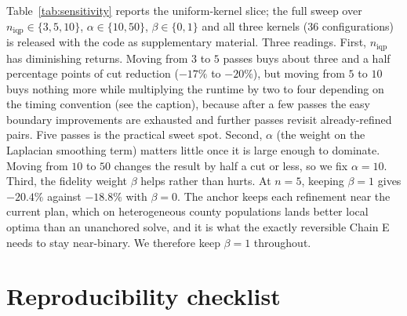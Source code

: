 \documentclass[11pt]{article}
\begin{document}
Table~\ref{tab:sensitivity} reports the uniform-kernel slice; the
full sweep over $n_{\mathrm{iqp}} \in \{3,5,10\}$,
$\alpha \in \{10,50\}$, $\beta \in \{0,1\}$ and all three kernels
(36 configurations) is released with the code as supplementary
material. Three readings. First, $n_{\mathrm{iqp}}$ has diminishing
returns.
Moving from $3$ to $5$ passes buys about three and a half percentage
points of cut reduction ($-17\%$ to $-20\%$), but moving from $5$ to
$10$ buys nothing more while multiplying the runtime by two to four
depending on the timing convention (see the caption), because after a
few passes the easy boundary improvements are exhausted and further
passes revisit already-refined pairs. Five passes is the practical
sweet spot. Second, $\alpha$ (the weight on the Laplacian smoothing
term) matters little once it is large enough to dominate. Moving from
$10$ to $50$ changes the result by half a cut or less, so we fix
$\alpha = 10$. Third, the
fidelity weight $\beta$ helps rather than hurts. At $n = 5$, keeping
$\beta = 1$ gives $-20.4\%$ against $-18.8\%$ with $\beta = 0$. The
anchor keeps each refinement near the current plan, which on
heterogeneous county populations lands better local optima than an
unanchored solve, and it is what the exactly reversible Chain E needs
to stay near-binary. We therefore keep $\beta = 1$ throughout.

\section{Reproducibility checklist}\label{app:reproducibility}
\end{document}
